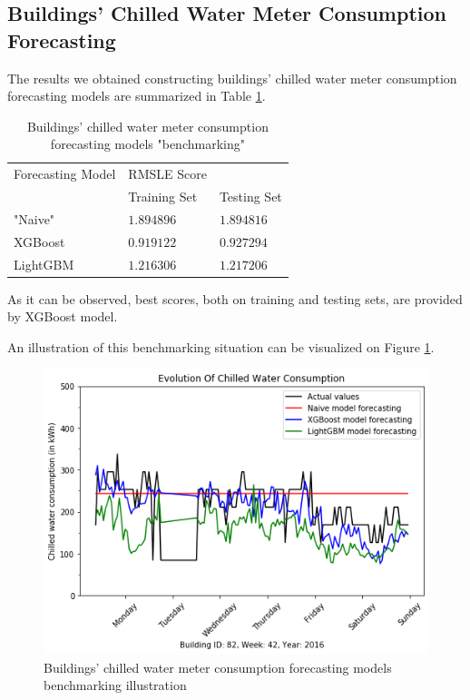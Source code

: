 \documentclass[twocolumn, switch]{article}
\begin{document}
\subsection{Buildings' Chilled Water Meter Consumption Forecasting}

The results we obtained constructing buildings' chilled water meter consumption forecasting models are summarized in Table \ref{tab:chilled_water_benchmarking}.

\begin{table}[H]
\caption{Buildings' chilled water meter consumption forecasting models "benchmarking"}
\centering
\begin{tabular}{lll}
\toprule
Forecasting Model & RMSLE Score & \\
& Training Set & Testing Set \\
\midrule
"Naive" & $1.894896$ & $1.894816$ \\
XGBoost & $0.919122$ & $0.927294$ \\
LightGBM & $1.216306$ & $1.217206$ \\
\bottomrule
\end{tabular}
\label{tab:chilled_water_benchmarking}
\end{table}

As it can be observed, best scores, both on training and testing sets, are provided by XGBoost model.

An illustration of this benchmarking situation can be visualized on Figure \ref{fig:chilled_water_benchmarking_illustration}.

\begin{figure}[H]
\centering
\includegraphics[scale=0.35]{../graphs/sample_chilled_water_consumption_comparison}
\caption{Buildings' chilled water meter consumption forecasting models benchmarking illustration}
\label{fig:chilled_water_benchmarking_illustration}
\end{figure}
\end{document}
